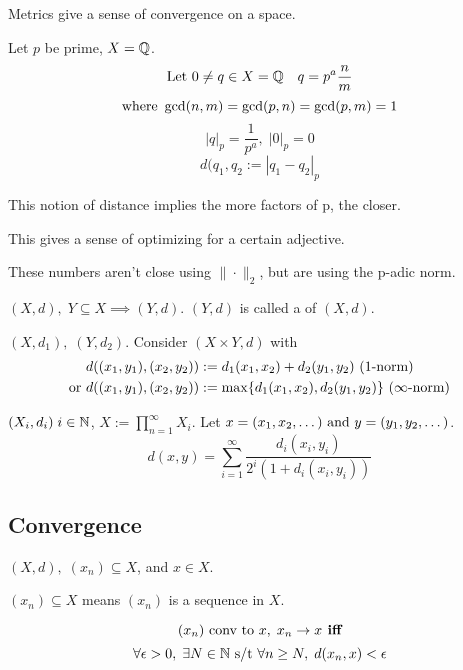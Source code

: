 \documentclass[12pt]{article}
\begin{document}
\bboxnote
\begin{note}
  Metrics give a sense of convergence on a space.
\end{note}
\ebox

\bboxex
\begin{exam}
  Let \(p\) be prime, \(X=\mathbb Q\).
  \[\text{Let }0\neq q\in X=\mathbb Q\quad q=p^a\frac nm\]
  \[\text{where }\gcd(n,m)=\gcd(p,n)=\gcd(p,m)=1\]
  \[|q|_p=\frac1{p^a},\;|0|_p=0\]
  \[d(q_1,q_2:=|q_1-q_2|_p\]
  \bboxnote
  \begin{note}
    This notion of distance implies the more factors of p, the closer.

    This gives a sense of optimizing for a certain adjective.

    These numbers aren't close using \(\|\cdot\|_2\), but are using
    the p-adic norm.
  \end{note}
  \ebox
\end{exam}
\ebox


\bbox
\begin{defn}\label{defn:subspace_of_a_metric_space}
  \((X,d),\;Y\subseteq X\implies(Y,d)\). \((Y,d)\) is called a 
   of \((X,d)\).
\end{defn}
\ebox

\bbox
\begin{defn}
  \((X,d_1),\;(Y,d_2)\). Consider \((X\times Y,d)\) with
  \begin{align*}
    d((x_1,y_1),(x_2,y_2))&:=d_1(x_1,x_2)+d_2(y_1,y_2)\ (\T{1-norm})\\
    \T{or }d((x_1,y_1),(x_2,y_2))&:=\max\{d_1(x_1,x_2),d_2(y_1,y_2)\}\ (\infty\T{-norm})\\
  \end{align*}
\end{defn}
\ebox

\bboxex
\begin{exam}\label{exam:product_metric}
  \((X_i,d_i)\;i\in\mathbb N\), \(X:=\prod_{n=1}^\infty X_i\). Let 
  \(x=(x_1,x_2,\dots)\text{ and }y=(y_1,y_2,\dots)\).
  \[d(x,y)=\sum_{i=1}^\infty\frac{d_i(x_i,y_i)}{2^i(1+d_i(x_i,y_i))}\]
\end{exam}
\ebox

\subsection{Convergence}

\bbox
\begin{defn}\label{defn:convergence_of_a_sequence}
  \((X,d),\;(x_n)\subseteq X\), and \(x\in X\).
  \bboxnote
  \begin{nota}
    \((x_n)\subseteq X\) means \((x_n)\) is a sequence in \(X\). 
  \end{nota}
  \ebox
  \[(x_n)\text{ conv to }x,\;x_n\to x\textbf{ iff}\]
  \[\forall\epsilon>0,\;\exists N\in\mathbb N\text{ s/t }\forall n\ge N,\;d(x_n,x)<\epsilon\]
\end{defn}
\ebox
\end{document}
